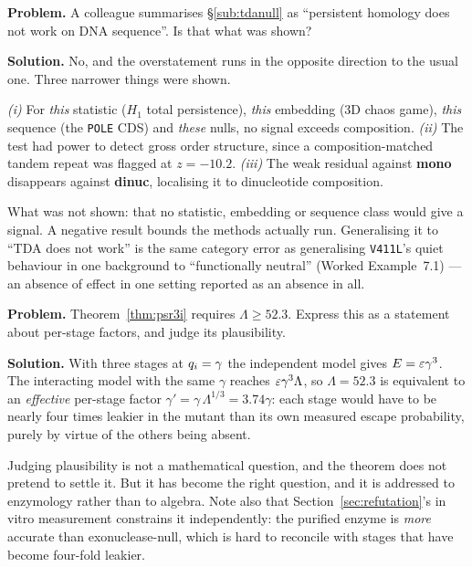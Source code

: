\begin{worked}
\textbf{Problem.} A colleague summarises \S\ref{sub:tdanull} as ``persistent
homology does not work on DNA sequence''. Is that what was shown?

\textbf{Solution.} No, and the overstatement runs in the opposite direction to
the usual one. Three narrower things were shown.

\emph{(i)} For \emph{this} statistic ($H_1$ total persistence), \emph{this}
embedding (3D chaos game), \emph{this} sequence (the \texttt{POLE} CDS) and
\emph{these} nulls, no signal exceeds composition. \emph{(ii)} The test had power
to detect gross order structure, since a composition-matched tandem repeat was
flagged at $z = -10.2$. \emph{(iii)} The weak residual against \textbf{mono}
disappears against \textbf{dinuc}, localising it to dinucleotide composition.

What was not shown: that no statistic, embedding or sequence class would give a
signal. A negative result bounds the methods actually run. Generalising it to
``TDA does not work'' is the same category error as generalising \texttt{V411L}'s
quiet behaviour in one background to ``functionally neutral''
(Worked Example~7.1) --- an absence of effect in one setting reported as an
absence in all.
\end{worked}

\begin{worked}
\textbf{Problem.} Theorem~\ref{thm:psr3i} requires $\Lambda \ge 52.3$. Express
this as a statement about per-stage factors, and judge its plausibility.

\textbf{Solution.} With three stages at $q_i = \gamma$ the independent
model gives $E = \varepsilon\gamma^3$. The interacting model with the same
$\gamma$ reaches $\varepsilon\gamma^3\Lambda$, so $\Lambda = 52.3$ is equivalent to
an \emph{effective} per-stage factor $\gamma' = \gamma\,\Lambda^{1/3} = 3.74\gamma$:
each stage would have to be nearly four times leakier in the mutant than its own
measured escape probability, purely by virtue of the others being absent.

Judging plausibility is not a mathematical question, and the theorem does not
pretend to settle it. But it has become the right question, and it is addressed
to enzymology rather than to algebra. Note also that
Section~\ref{sec:refutation}'s in vitro measurement constrains it independently:
the purified enzyme is \emph{more} accurate than exonuclease-null, which is hard
to reconcile with stages that have become four-fold leakier.
\end{worked}

